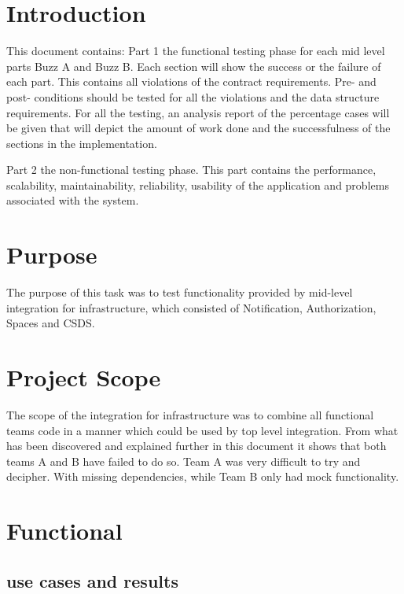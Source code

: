 \documentclass[12pt]{article}
\begin{document}
\section{Introduction} %
This document contains:
Part 1 the functional testing phase for each mid level parts Buzz A and Buzz B.
Each section will show the success or the failure of each part. This contains all violations of the contract requirements.
Pre- and post- conditions should be tested for all the violations and the data structure requirements.
For all the testing, an analysis report of the percentage cases will be given that will depict the amount of work done and the successfulness of the sections in the implementation.

Part 2 the non-functional testing phase.
This part contains the performance, scalability, maintainability, reliability, usability of the application and problems associated with the system.

\section{Purpose} %
The purpose of this task was to test functionality provided by mid-level integration for infrastructure, which consisted of Notification, Authorization, Spaces and CSDS.


\section{Project Scope} %
The scope of the integration for infrastructure was to combine all functional teams code in a manner which could be used by top level integration. From what has been discovered and explained further in this document it shows that both teams A and B have failed to do so. Team A was very difficult to try and decipher. With missing dependencies, while Team B only had mock functionality.

\section{Functional} %
\subsection{use cases and results}
\end{document}
